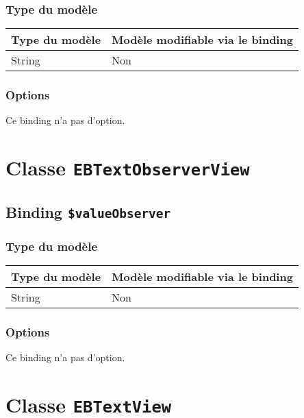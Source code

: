 \subsubsection{Type du modèle}

\begin{tabular}{|l|l|}
\hline
\textbf{Type du modèle} & \textbf{Modèle modifiable via le binding}\\
\hline
String & Non\\
\hline
\end{tabular}
\subsubsection{Options}

Ce binding n'a pas d'option.








\section{Classe \texttt{EBTextObserverView}}

\subsection{Binding \texttt{\$valueObserver}}

\subsubsection{Type du modèle}

\begin{tabular}{|l|l|}
\hline
\textbf{Type du modèle} & \textbf{Modèle modifiable via le binding}\\
\hline
String & Non\\
\hline
\end{tabular}
\subsubsection{Options}

Ce binding n'a pas d'option.








\section{Classe \texttt{EBTextView}}

